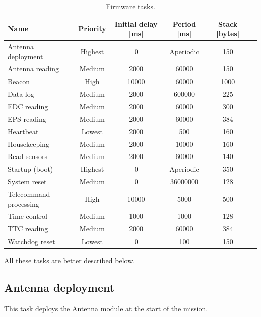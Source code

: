 \begin{table}[!ht]
    \centering
    \begin{tabular}{lccccc}
        \toprule[1.5pt]
        \textbf{Name} & \textbf{Priority} & \textbf{Initial delay [ms]} & \textbf{Period [ms]} & \textbf{Stack [bytes]} \\
        \midrule
        Antenna deployment     & Highest & 0      & Aperiodic & 150  \\
        Antenna reading        & Medium  & 2000   & 60000     & 150  \\
        Beacon                 & High    & 10000  & 60000     & 1000 \\
        Data log               & Medium  & 2000   & 600000    & 225  \\
        EDC reading            & Medium  & 2000   & 60000     & 300  \\
        EPS reading            & Medium  & 2000   & 60000     & 384  \\
        Heartbeat              & Lowest  & 2000   & 500       & 160  \\
        Housekeeping           & Medium  & 2000   & 10000     & 160  \\
        Read sensors           & Medium  & 2000   & 60000     & 140  \\
        Startup (boot)         & Highest & 0      & Aperiodic & 350  \\
        System reset           & Medium  & 0      & 36000000  & 128  \\
        Telecommand processing & High    & 10000  & 5000      & 500  \\
        Time control           & Medium  & 1000   & 1000      & 128  \\
        TTC reading            & Medium  & 2000   & 60000     & 384  \\
        Watchdog reset         & Lowest  & 0      & 100       & 150  \\
        \bottomrule[1.5pt]
    \end{tabular}
    \caption{Firmware tasks.}
    \label{tab:firmware-tasks}
\end{table}

All these tasks are better described below.

\subsection{Antenna deployment}

This task deploys the Antenna module at the start of the mission.

